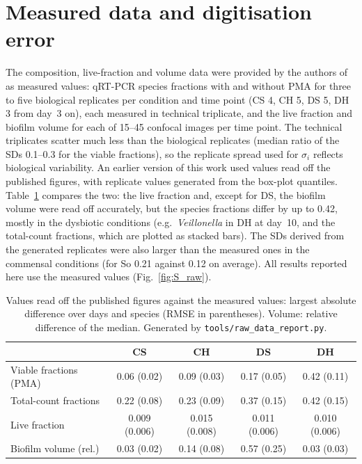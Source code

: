 \documentclass[11pt,a4paper]{article}
\begin{document}
\section{Measured data and digitisation error}
\label{sec:S_raw}
The composition, live-fraction and volume data were provided by the authors of \citet{heine2025influence} as measured values: qRT-PCR species fractions with and without PMA for three to five biological replicates per condition and time point (CS 4, CH 5, DS 5, DH 3 from day~3 on), each measured in technical triplicate, and the live fraction and biofilm volume for each of 15--45 confocal images per time point.
The technical triplicates scatter much less than the biological replicates (median ratio of the SDs 0.1--0.3 for the viable fractions), so the replicate spread used for $\sigma_i$ reflects biological variability.
An earlier version of this work used values read off the published figures, with replicate values generated from the box-plot quantiles.
Table~\ref{tab:S_raw} compares the two: the live fraction and, except for DS, the biofilm volume were read off accurately, but the species fractions differ by up to 0.42, mostly in the dysbiotic conditions (e.g.\ \textit{Veillonella} in DH at day~10, and the total-count fractions, which are plotted as stacked bars).
The SDs derived from the generated replicates were also larger than the measured ones in the commensal conditions (for So 0.21 against 0.12 on average).
All results reported here use the measured values (Fig.~\ref{fig:S_raw}).

\begin{table}[h]
\centering
\caption{Values read off the published figures against the measured values: largest absolute difference over days and species (RMSE in parentheses). Volume: relative difference of the median. Generated by \texttt{tools/raw\_data\_report.py}.}
\label{tab:S_raw}
\small
\begin{tabular}{lcccc}
\toprule
 & CS & CH & DS & DH\\
\midrule
Viable fractions (PMA) & 0.06 (0.02) & 0.09 (0.03) & 0.17 (0.05) & 0.42 (0.11)\\
Total-count fractions & 0.22 (0.08) & 0.23 (0.09) & 0.37 (0.15) & 0.42 (0.15)\\
Live fraction & 0.009 (0.006) & 0.015 (0.008) & 0.011 (0.006) & 0.010 (0.006)\\
Biofilm volume (rel.) & 0.03 (0.02) & 0.14 (0.08) & 0.57 (0.25) & 0.03 (0.03)\\
\bottomrule
\end{tabular}
\end{table}
\end{document}
